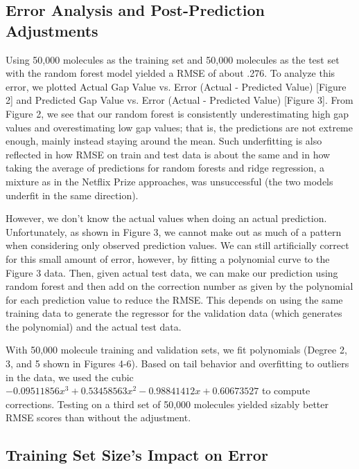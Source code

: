 \documentclass{article}
\begin{document}
\subsection{Error Analysis and Post-Prediction Adjustments}

Using 50,000 molecules as the training set and 50,000 molecules as the test set with the random forest model yielded a RMSE of about .276. To analyze this error, we plotted Actual Gap Value vs. Error (Actual - Predicted Value) [Figure 2] and Predicted Gap Value vs. Error (Actual - Predicted Value) [Figure 3]. From Figure 2, we see that our random forest is consistently underestimating high gap values and overestimating low gap values; that is, the predictions are not extreme enough, mainly instead staying around the mean. Such underfitting is also reflected in how RMSE on train and test data is about the same and in how taking the average of predictions for random forests and ridge regression, a mixture as in the Netflix Prize approaches, was unsuccessful (the two models underfit in the same direction).

However, we don't know the actual values when doing an actual prediction. Unfortunately, as shown in Figure 3, we cannot make out as much of a pattern when considering only observed prediction values. We can still artificially correct for this small amount of error, however, by fitting a polynomial curve to the Figure 3 data. Then, given actual test data, we can make our prediction using random forest and then add on the correction number as given by the polynomial for each prediction value to reduce the RMSE. This depends on using the same training data to generate the regressor for the validation data (which generates the polynomial) and the actual test data.

With 50,000 molecule training and validation sets, we fit polynomials (Degree 2, 3, and 5 shown in Figures 4-6). Based on tail behavior and overfitting to outliers in the data, we used the cubic $-0.09511856x^3+0.53458563x^2-0.98841412x+0.60673527$ to compute corrections. Testing on a third set of 50,000 molecules yielded sizably better RMSE scores than without the adjustment.

\subsection{Training Set Size's Impact on Error}
\end{document}
